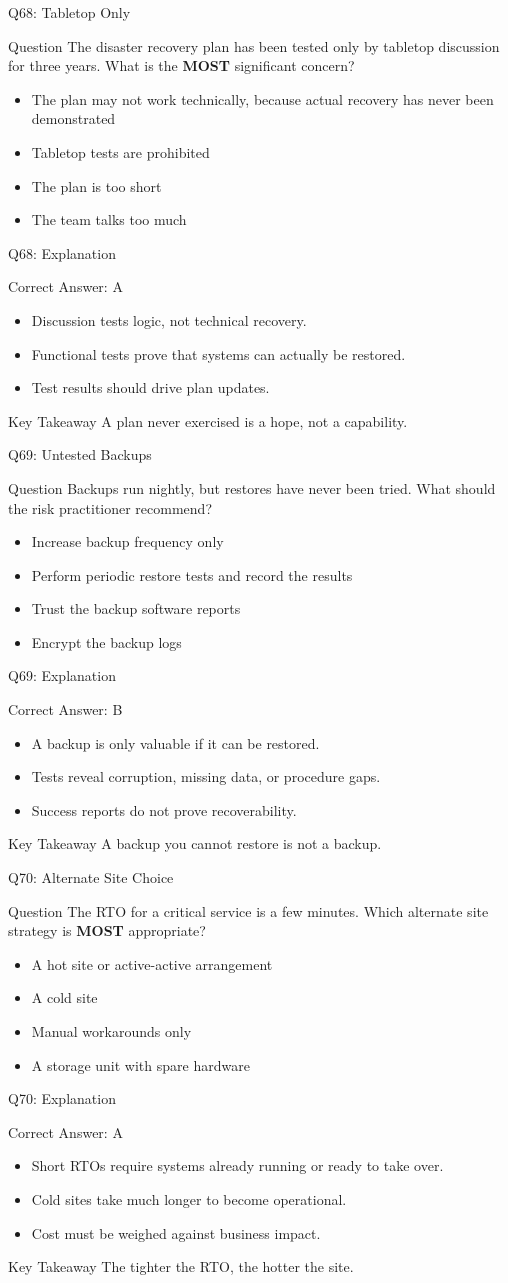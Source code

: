 \documentclass[aspectratio=169]{beamer}
\newcommand{\hq}[7]{%
	\begin{frame}{Q#1: #2}
		\begin{block}{Question}
			#3
		\end{block}
		\begin{itemize}
			#4
		\end{itemize}
	\end{frame}
	\begin{frame}{Q#1: Explanation}
		\begin{block}{Correct Answer: #5}
			\begin{itemize}
				#6
			\end{itemize}
		\end{block}
		\begin{alertblock}{Key Takeaway}
			#7
		\end{alertblock}
	\end{frame}
}
\begin{document}
	\hq{68}{Tabletop Only}
	{The disaster recovery plan has been tested only by tabletop discussion for three years. What is the \textbf{MOST} significant concern?}
	{\item[\textbf{(A)}] The plan may not work technically, because actual recovery has never been demonstrated
		\item[\textbf{(B)}] Tabletop tests are prohibited
		\item[\textbf{(C)}] The plan is too short
		\item[\textbf{(D)}] The team talks too much}
	{A}
	{\item Discussion tests logic, not technical recovery.
		\item Functional tests prove that systems can actually be restored.
		\item Test results should drive plan updates.}
	{A plan never exercised is a hope, not a capability.}
	
	\hq{69}{Untested Backups}
	{Backups run nightly, but restores have never been tried. What should the risk practitioner recommend?}
	{\item[\textbf{(A)}] Increase backup frequency only
		\item[\textbf{(B)}] Perform periodic restore tests and record the results
		\item[\textbf{(C)}] Trust the backup software reports
		\item[\textbf{(D)}] Encrypt the backup logs}
	{B}
	{\item A backup is only valuable if it can be restored.
		\item Tests reveal corruption, missing data, or procedure gaps.
		\item Success reports do not prove recoverability.}
	{A backup you cannot restore is not a backup.}
	
	\hq{70}{Alternate Site Choice}
	{The RTO for a critical service is a few minutes. Which alternate site strategy is \textbf{MOST} appropriate?}
	{\item[\textbf{(A)}] A hot site or active-active arrangement
		\item[\textbf{(B)}] A cold site
		\item[\textbf{(C)}] Manual workarounds only
		\item[\textbf{(D)}] A storage unit with spare hardware}
	{A}
	{\item Short RTOs require systems already running or ready to take over.
		\item Cold sites take much longer to become operational.
		\item Cost must be weighed against business impact.}
	{The tighter the RTO, the hotter the site.}
	
\end{document}

